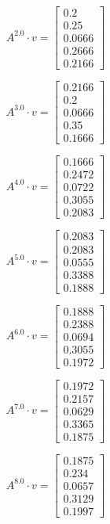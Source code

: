 \documentclass{article}
\begin{document}
  $$A^{2.0} \cdot v = \begin{bmatrix}
  0.2\\
  0.25\\
  0.0666\\
  0.2666\\
  0.2166
  \end{bmatrix}
  $$
  
  $$A^{3.0} \cdot v = \begin{bmatrix}
  0.2166\\
  0.2\\
  0.0666\\
  0.35\\
  0.1666
  \end{bmatrix}
  $$
  
  $$A^{4.0} \cdot v = \begin{bmatrix}
  0.1666\\
  0.2472\\
  0.0722\\
  0.3055\\
  0.2083
  \end{bmatrix}
  $$
  
  $$A^{5.0} \cdot v = \begin{bmatrix}
  0.2083\\
  0.2083\\
  0.0555\\
  0.3388\\
  0.1888
  \end{bmatrix}
  $$
  
  $$A^{6.0} \cdot v = \begin{bmatrix}
  0.1888\\
  0.2388\\
  0.0694\\
  0.3055\\
  0.1972
  \end{bmatrix}
  $$
  
  $$A^{7.0} \cdot v = \begin{bmatrix}
  0.1972\\
  0.2157\\
  0.0629\\
  0.3365\\
  0.1875
  \end{bmatrix}
  $$
  
  $$A^{8.0} \cdot v = \begin{bmatrix}
  0.1875\\
  0.234\\
  0.0657\\
  0.3129\\
  0.1997
  \end{bmatrix}
  $$
  
\end{document}
